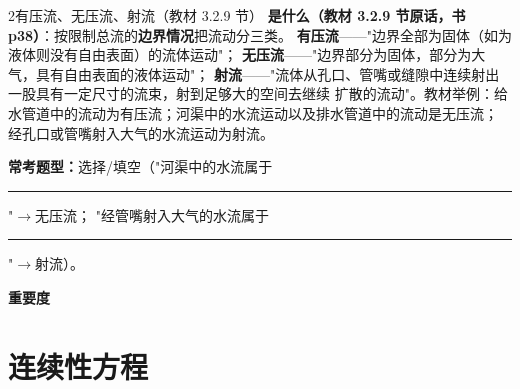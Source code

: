 \begin{kaodian}{2}{有压流、无压流、射流（教材 3.2.9 节）}
\textbf{是什么（教材 3.2.9 节原话，书 p38）}：按限制总流的\textbf{边界情况}把流动分三类。
\textbf{有压流}——"边界全部为固体（如为液体则没有自由表面）的流体运动"；
\textbf{无压流}——"边界部分为固体，部分为大气，具有自由表面的液体运动"；
\textbf{射流}——"流体从孔口、管嘴或缝隙中连续射出一股具有一定尺寸的流束，射到足够大的空间去继续
扩散的流动"。教材举例：给水管道中的流动为有压流；河渠中的水流运动以及排水管道中的流动是无压流；
经孔口或管嘴射入大气的水流运动为射流。

\textbf{常考题型：}选择/填空（"河渠中的水流属于\rule{2.5cm}{0.4pt}"$\to$无压流；
"经管嘴射入大气的水流属于\rule{2cm}{0.4pt}"$\to$射流）。

\textbf{重要度 }\quad{}\quad{}
\end{kaodian}

\section{连续性方程}

